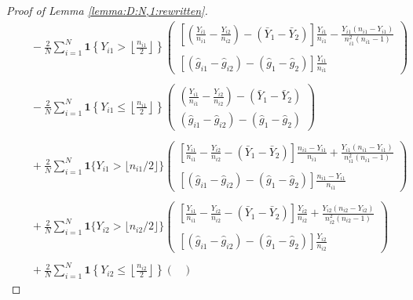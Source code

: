 \documentclass[10pt,a4paper]{amsart}
\begin{document}
\begin{proof}[Proof of Lemma \ref{lemma:D:N,1:rewritten}]
\begin{equation}
\begin{array}{rl}
&\quad\displaystyle-\frac{2}{N}\sum_{i=1}^N\mathbf{1}\left\{Y_{i1}>\left\lfloor\frac{n_{i1}}{2}\right\rfloor\right\}\begin{pmatrix}
\displaystyle\left[\left(\frac{Y_{i1}}{n_{i1}}-\frac{Y_{i2}}{n_{i2}}\right)-(\bar{Y}_1-\bar{Y}_2)\right]\frac{Y_{i1}}{n_{i1}}-\frac{Y_{i1}(n_{i1}-Y_{i1})}{n_{i1}^2(n_{i1}-1)}\\
\\
\displaystyle[(\hat{g}_{i1}-\hat{g}_{i2})-(\hat{g}_1-\hat{g}_2)]\frac{Y_{i1}}{n_{i1}}
\end{pmatrix}\\
\\
&\quad\displaystyle-\frac{2}{N}\sum_{i=1}^N\mathbf{1}\left\{Y_{i1}\leq\left\lfloor \frac{n_{i1}}{2}\right\rfloor\right\}\begin{pmatrix}
\displaystyle\left(\frac{Y_{i1}}{n_{i1}}-\frac{Y_{i2}}{n_{i2}}\right)-(\bar{Y}_1-\bar{Y}_2)\\
\displaystyle(\hat{g}_{i1}-\hat{g}_{i2})-(\hat{g}_1-\hat{g}_2)
\end{pmatrix}\\
\\
&\quad\displaystyle+\frac{2}{N}\sum_{i=1}^N\mathbf{1}\{Y_{i1} > \lfloor n_{i1}/2\rfloor\}\begin{pmatrix}
\displaystyle\left[\frac{Y_{i1}}{n_{i1}}-\frac{Y_{i2}}{n_{i2}}-(\bar{Y}_1-\bar{Y}_2)\right]\frac{n_{i1}-Y_{i1}}{n_{i1}}+\frac{Y_{i1}(n_{i1}-Y_{i1})}{n_{i1}^2(n_{i1}-1)}\\
\\
\displaystyle\left[(\hat{g}_{i1}-\hat{g}_{i2})-(\hat{g}_1-\hat{g}_2)\right]\frac{n_{i1}-Y_{i1}}{n_{i1}}
\end{pmatrix}\\
\\
&\displaystyle\quad+\frac{2}{N}\sum_{i=1}^N\mathbf{1}\{Y_{i2} > \lfloor n_{i2}/2\rfloor\}\begin{pmatrix}
\displaystyle\left[\frac{Y_{i1}}{n_{i1}}-\frac{Y_{i2}}{n_{i2}}-(\bar{Y}_1-\bar{Y}_2)\right]\frac{Y_{i2}}{n_{i2}}+\frac{Y_{i2}(n_{i2}-Y_{i2})}{n_{i2}^2(n_{i2}-1)}\\
\\
\displaystyle[(\hat{g}_{i1}-\hat{g}_{i2})-(\hat{g}_1-\hat{g}_2)]\frac{Y_{i2}}{n_{i2}}
\end{pmatrix}\\
\\
&\displaystyle\quad+\frac{2}{N}\sum_{i=1}^N\mathbf{1}\left\{Y_{i2}\leq\left\lfloor\frac{n_{i2}}{2}\right\rfloor\right\}\begin{pmatrix}

\end{pmatrix}
\end{array}
\end{equation}
\end{proof}
\end{document}
